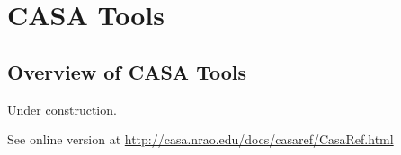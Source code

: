 

\chapter{CASA Tools}
\label{chapter:tools}

\section{Overview of CASA Tools}
\label{section:tasks.list}


Under construction.

See online version at
\url{http://casa.nrao.edu/docs/casaref/CasaRef.html}


